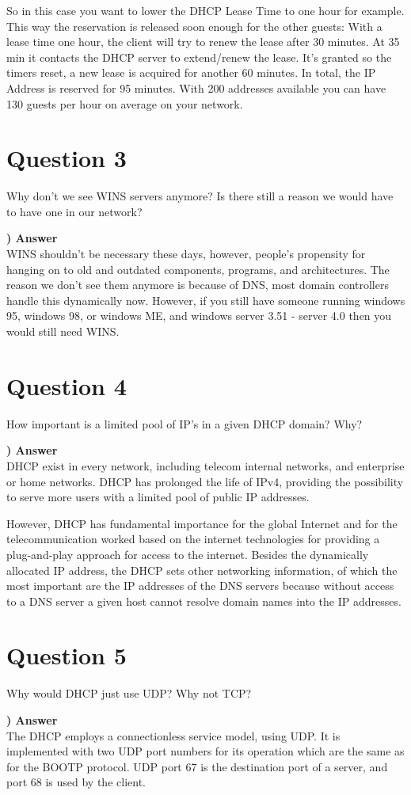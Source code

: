 \documentclass{report}
\newcommand{\mysection}[1]{\section*{#1}}
\newcommand{\mysubsection}[2]{\textbf{\romannumeral #1) #2}}
\begin{document}
So in this case you want to lower the DHCP Lease Time to one hour for example. 
This way the reservation is released soon enough for the other guests: 
With a lease time one hour, the client will try to renew the lease 
after 30 minutes. At 35 min it contacts the DHCP server to 
extend/renew the lease. It’s granted so the timers reset, a new lease is 
acquired for another 60 minutes. In total, the IP Address is reserved 
for 95 minutes. With 200 addresses available you can have 
130 guests per hour on average on your network.


\mysection{\textbf{Question 3}}
Why don't we see WINS servers anymore?  Is there still a reason we would have to have one in our network?

\noindent\mysubsection{3}{Answer}
\\WINS shouldn't  be necessary these days, however, people's propensity for hanging on to
old and outdated components, programs, and architectures. The reason we don't see them
anymore is because of DNS, most domain controllers handle this dynamically now.
However,  if you still have someone running windows 95, windows 98, or windows ME, and
windows server 3.51 - server 4.0 then you would still need WINS.

\mysection{\textbf{Question 4}}
How important is a limited pool of IP's in a given DHCP domain?  Why?

\noindent\mysubsection{4}{Answer}
\\DHCP exist in every network, including telecom internal networks, and enterprise or
home networks. DHCP has prolonged the life of IPv4, providing the possibility to serve
more users with a limited pool of public IP addresses.

However, DHCP has fundamental importance for the global Internet 
and for the telecommunication worked based on the internet technologies 
for providing a plug-and-play approach for access to the internet. 
Besides the dynamically allocated IP address, the DHCP sets other networking
information, of which the most important are the IP addresses of the DNS servers
because without access to a DNS server a given host cannot resolve domain names into
the IP addresses.


\mysection{\textbf{Question 5}}
Why would DHCP just use UDP?  Why not TCP?

\noindent\mysubsection{5}{Answer}
\\The DHCP employs a connectionless service model, using UDP. It is implemented with
two UDP port numbers for its operation which are the same as for the BOOTP protocol.
UDP port 67 is the destination port of a server, and port 68 is used by the client.
\end{document}
